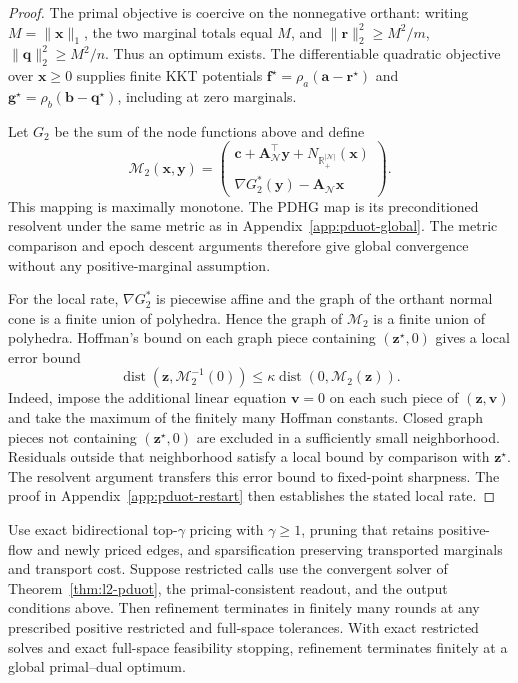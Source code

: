 \begin{proof}
The primal objective is coercive on the nonnegative orthant: writing $M=\|\mathbf x\|_1$, the two marginal totals equal $M$, and $\|\mathbf r\|_2^2\geq M^2/m$, $\|\mathbf q\|_2^2\geq M^2/n$.
Thus an optimum exists.
The differentiable quadratic objective over $\mathbf x\geq0$ supplies finite KKT potentials $\mathbf f^\star=\rho_a(\mathbf a-\mathbf r^\star)$ and $\mathbf g^\star=\rho_b(\mathbf b-\mathbf q^\star)$, including at zero marginals.

Let $G_2$ be the sum of the node functions above and define
\begin{equation*}
\mathcal M_2(\mathbf x,\mathbf y)=
\begin{pmatrix}
\mathbf c+\mathbf A_{\mathcal N}^{\top}\mathbf y+N_{\mathbb R_+^{|\mathcal N|}}(\mathbf x)\\
\nabla G_2^*(\mathbf y)-\mathbf A_{\mathcal N}\mathbf x
\end{pmatrix}.
\end{equation*}
This mapping is maximally monotone.
The PDHG map is its preconditioned resolvent under the same metric as in Appendix~\ref{app:pduot-global}.
The metric comparison and epoch descent arguments therefore give global convergence without any positive-marginal assumption.

For the local rate, $\nabla G_2^*$ is piecewise affine and the graph of the orthant normal cone is a finite union of polyhedra.
Hence the graph of $\mathcal M_2$ is a finite union of polyhedra.
Hoffman's bound on each graph piece containing $(\mathbf z^\star,0)$ gives a local error bound
\begin{equation*}
\operatorname{dist}(\mathbf z,\mathcal M_2^{-1}(0))\leq\kappa\operatorname{dist}(0,\mathcal M_2(\mathbf z)).
\end{equation*}
Indeed, impose the additional linear equation $\mathbf v=0$ on each such piece of $(\mathbf z,\mathbf v)$ and take the maximum of the finitely many Hoffman constants.
Closed graph pieces not containing $(\mathbf z^\star,0)$ are excluded in a sufficiently small neighborhood.
Residuals outside that neighborhood satisfy a local bound by comparison with $\mathbf z^\star$.
The resolvent argument transfers this error bound to fixed-point sharpness.
The proof in Appendix~\ref{app:pduot-restart} then establishes the stated local rate.
\end{proof}

\begin{theorem}
\label{thm:l2-refinement}
Use exact bidirectional top-$\gamma$ pricing with $\gamma\geq1$, pruning that retains positive-flow and newly priced edges, and sparsification preserving transported marginals and transport cost.
Suppose restricted calls use the convergent solver of Theorem~\ref{thm:l2-pduot}, the primal-consistent readout, and the output conditions above.
Then refinement terminates in finitely many rounds at any prescribed positive restricted and full-space tolerances.
With exact restricted solves and exact full-space feasibility stopping, refinement terminates finitely at a global primal--dual optimum.
\end{theorem}

